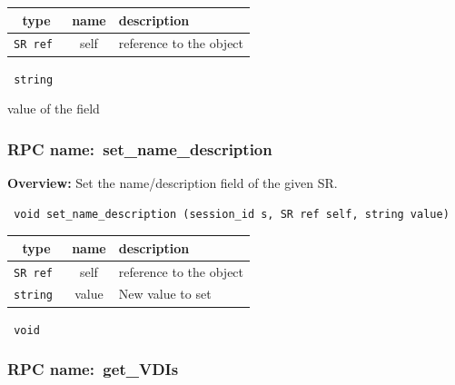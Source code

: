 
 
\vspace{0.3cm}
\begin{tabular}{|c|c|p{7cm}|}
 \hline
{\bf type} & {\bf name} & {\bf description} \\ \hline
{\tt SR ref } & self & reference to the object \\ \hline 

\end{tabular}

\vspace{0.3cm}

{\tt 
string
}


value of the field
\vspace{0.3cm}
\vspace{0.3cm}
\vspace{0.3cm}
\subsubsection{RPC name:~set\_name\_description}

{\bf Overview:} 
Set the name/description field of the given SR.

\begin{verbatim} void set_name_description (session_id s, SR ref self, string value)\end{verbatim}



 
\vspace{0.3cm}
\begin{tabular}{|c|c|p{7cm}|}
 \hline
{\bf type} & {\bf name} & {\bf description} \\ \hline
{\tt SR ref } & self & reference to the object \\ \hline 

{\tt string } & value & New value to set \\ \hline 

\end{tabular}

\vspace{0.3cm}

{\tt 
void
}



\vspace{0.3cm}
\vspace{0.3cm}
\vspace{0.3cm}
\subsubsection{RPC name:~get\_VDIs}


